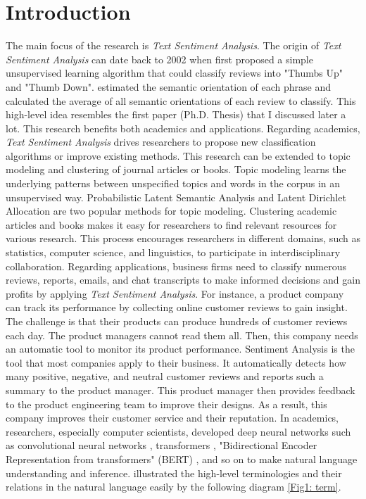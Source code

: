 \documentclass[aoas]{imsart}
\numberwithin{equation}{section}
\theoremstyle{plain}
\theoremstyle{remark}
\begin{document}
\section{Introduction}
The main focus of the research is \textit{Text Sentiment Analysis}. The origin of \textit{Text Sentiment Analysis} can date back to 2002 when \cite{DBLP:journals/corr/cs-LG-0212032} first proposed a simple unsupervised learning algorithm that could classify reviews into "Thumbs Up" and "Thumb Down". \cite{DBLP:journals/corr/cs-LG-0212032} estimated the semantic orientation of each phrase and calculated the average of all semantic orientations of each review to classify. This high-level idea resembles the first paper (Ph.D. Thesis) \cite{chenyu} that I discussed later a lot. This research benefits both academics and applications. Regarding academics, \textit{Text Sentiment Analysis} drives researchers to propose new classification algorithms or improve existing methods. This research can be extended to topic modeling and clustering of journal articles or books. Topic modeling learns the underlying patterns between unspecified topics and words in the corpus in an unsupervised way. Probabilistic Latent Semantic Analysis and Latent Dirichlet Allocation are two popular methods for topic modeling. Clustering academic articles and books makes it easy for researchers to find relevant resources for various research. This process encourages researchers in different domains, such as statistics, computer science, and linguistics, to participate in interdisciplinary collaboration. Regarding applications, business firms need to classify numerous reviews, reports, emails, and chat transcripts to make informed decisions and gain profits by applying \textit{Text Sentiment Analysis}. For instance, a product company can track its performance by collecting online customer reviews to gain insight. The challenge is that their products can produce hundreds of customer reviews each day. The product managers cannot read them all. Then, this company needs an automatic tool to monitor its product performance. Sentiment Analysis is the tool that most companies apply to their business. It automatically detects how many positive, negative, and neutral customer reviews and reports such a summary to the product manager. This product manager then provides feedback to the product engineering team to improve their designs. As a result, this company improves their customer service and their reputation. In academics, researchers, especially computer scientists, developed deep neural networks \cite{pitts} such as convolutional neural networks \cite{NIPS2012_c399862d}, transformers \cite{DBLP:journals/corr/abs-1910-03771}, "Bidirectional Encoder Representation from transformers" (BERT) \cite{DBLP:journals/corr/abs-1810-04805}, and so on to make natural language understanding and inference. \cite{f1} illustrated the high-level terminologies and their relations in the natural language easily by the following diagram \ref{Fig1: term}. 
\end{document}
